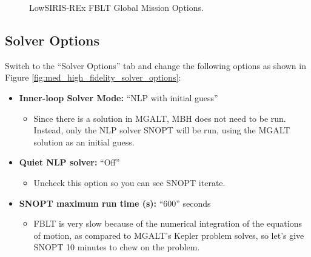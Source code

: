 \documentclass[11pt]{article}
\begin{document}
\begin{figure}[H]
	\centering
	\caption{\label{fig:med_high_fidelity_global_options}LowSIRIS-REx \ac{FBLT} Global Mission Options.}
\end{figure}

\subsection{Solver Options}
\label{sec:med_high_fidelity_solver_options}

Switch to the “Solver Options” tab and change the following options as shown in Figure \ref{fig:med_high_fidelity_solver_options}:

\begin{itemize}
	\item \textbf{Inner-loop Solver Mode:} ``\acs{NLP} with initial guess''
	\begin{itemize}
		\item Since there is a solution in \ac{MGALT}, \ac{MBH} does not need to be run. Instead, only the \ac{NLP} solver \acs{SNOPT} will be run, using the \ac{MGALT} solution as an initial guess.
	\end{itemize}
	\item \textbf{Quiet \ac{NLP} solver:} ``Off''
	\begin{itemize}
		\item Uncheck this option so you can see \acs{SNOPT} iterate.
	\end{itemize}
	\item \textbf{\acs{SNOPT} maximum run time (s):} ``600'' seconds
	\begin{itemize}
		\item \ac{FBLT} is very slow because of the numerical integration of the equations of motion, as compared to \ac{MGALT}'s Kepler problem solves, so let’s give \acs{SNOPT} 10 minutes to chew on the problem.
	\end{itemize}
\end{itemize}
\end{document}
